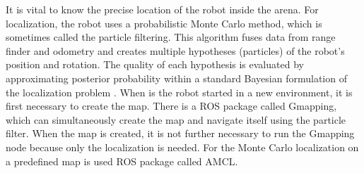 It is vital to know the precise location of the robot inside the arena. For localization, the robot uses a probabilistic Monte Carlo method, which is sometimes called the particle filtering. This algorithm fuses data from range finder and odometry and creates multiple hypotheses (particles) of the robot's position and rotation. The quality of each hypothesis is evaluated by approximating posterior probability within a standard Bayesian formulation of the localization problem \cite{dellaert1999} \cite{thrun2000}. When is the robot started in a new environment, it is first necessary to create the map. There is a ROS package called Gmapping, which can simultaneously create the map and navigate itself using the particle filter. When the map is created, it is not further necessary to run the Gmapping node because only the localization is needed. For the Monte Carlo localization on a predefined map is used ROS package called AMCL.

\newpage